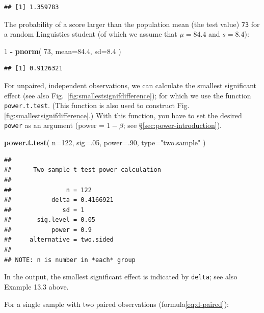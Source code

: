 \documentclass[
]{book}
\newenvironment{Shaded}{\begin{snugshade}}{\end{snugshade}}
\newcommand{\DataTypeTok}[1]{\textcolor[rgb]{0.13,0.29,0.53}{#1}}
\newcommand{\DecValTok}[1]{\textcolor[rgb]{0.00,0.00,0.81}{#1}}
\newcommand{\FloatTok}[1]{\textcolor[rgb]{0.00,0.00,0.81}{#1}}
\newcommand{\KeywordTok}[1]{\textcolor[rgb]{0.13,0.29,0.53}{\textbf{#1}}}
\newcommand{\NormalTok}[1]{#1}
\newcommand{\OperatorTok}[1]{\textcolor[rgb]{0.81,0.36,0.00}{\textbf{#1}}}
\newcommand{\StringTok}[1]{\textcolor[rgb]{0.31,0.60,0.02}{#1}}
\begin{document}
\begin{verbatim}
## [1] 1.359783
\end{verbatim}

The probability of a score larger than the population mean (the test value) \texttt{73} for a random Linguistics
student (of which we assume that \(\mu=84.4\) and \(s=8.4\)):

\begin{Shaded}
\begin{Highlighting}[]
\DecValTok{1} \OperatorTok{{-}}\StringTok{ }\KeywordTok{pnorm}\NormalTok{( }\DecValTok{73}\NormalTok{, }\DataTypeTok{mean=}\FloatTok{84.4}\NormalTok{, }\DataTypeTok{sd=}\FloatTok{8.4}\NormalTok{ ) }
\end{Highlighting}
\end{Shaded}

\begin{verbatim}
## [1] 0.9126321
\end{verbatim}

For unpaired, independent observations, we can calculate the smallest
significant effect (see also
Fig.~\ref{fig:smallestsignifdifference}); for which we use the function
\texttt{power.t.test}. (This function is
also used to construct Fig.\ref{fig:smallestsignifdifference}.)
With this function, you have to set the desired \texttt{power} as
an argument (power = \(1-\beta\); see
§\ref{sec:power-introduction}).

\begin{Shaded}
\begin{Highlighting}[]
\KeywordTok{power.t.test}\NormalTok{( }\DataTypeTok{n=}\DecValTok{122}\NormalTok{, }\DataTypeTok{sig=}\NormalTok{.}\DecValTok{05}\NormalTok{, }\DataTypeTok{power=}\NormalTok{.}\DecValTok{90}\NormalTok{, }\DataTypeTok{type=}\StringTok{"two.sample"}\NormalTok{ )}
\end{Highlighting}
\end{Shaded}

\begin{verbatim}
## 
##      Two-sample t test power calculation 
## 
##               n = 122
##           delta = 0.4166921
##              sd = 1
##       sig.level = 0.05
##           power = 0.9
##     alternative = two.sided
## 
## NOTE: n is number in *each* group
\end{verbatim}

In the output, the smallest significant effect is indicated by \texttt{delta}; see also
Example 13.3 above.

For a single sample with two paired observations
(formula\eqref{eq:d-paired}):
\end{document}
